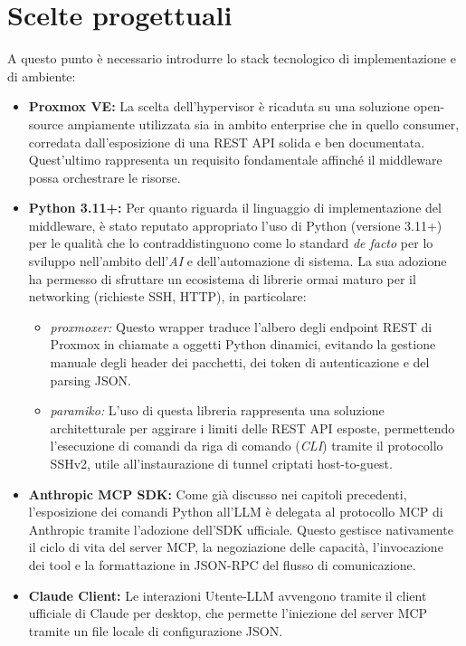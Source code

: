 \section{Scelte progettuali}
A questo punto è necessario introdurre lo stack tecnologico di implementazione e di ambiente:
\begin{itemize}
    \item \textbf{Proxmox VE:} La scelta dell'hypervisor è ricaduta su una soluzione open-source ampiamente utilizzata sia in ambito enterprise che in quello consumer, corredata dall'esposizione di una REST API solida e ben documentata. Quest'ultimo rappresenta un requisito fondamentale affinché il middleware possa orchestrare le risorse.

    \item \textbf{Python 3.11+:} Per quanto riguarda il linguaggio di implementazione del middleware, è stato reputato appropriato l'uso di Python (versione 3.11+) per le qualità che lo contraddistinguono come lo standard \textit{de facto} per lo sviluppo nell'ambito dell'\textit{AI} e dell'automazione di sistema. La sua adozione ha permesso di sfruttare un ecosistema di librerie ormai maturo per il networking (richieste SSH, HTTP), in particolare:
    \begin{itemize}
        \item \textit{proxmoxer:} Questo wrapper traduce l'albero degli endpoint REST di Proxmox in chiamate a oggetti Python dinamici, evitando la gestione manuale degli header dei pacchetti, dei token di autenticazione e del parsing JSON.
        \item \textit{paramiko:} L'uso di questa libreria rappresenta una soluzione architetturale per aggirare i limiti delle REST API esposte, permettendo l'esecuzione di comandi da riga di comando (\textit{CLI}) tramite il protocollo SSHv2, utile all'instaurazione di tunnel criptati host-to-guest.
    \end{itemize}
    
    \item \textbf{Anthropic MCP SDK:} Come già discusso nei capitoli precedenti, l'esposizione dei comandi Python all'LLM è delegata al protocollo MCP di Anthropic tramite l'adozione dell'SDK ufficiale. Questo gestisce nativamente il ciclo di vita del server MCP, la negoziazione delle capacità, l'invocazione dei tool e la formattazione in JSON-RPC del flusso di comunicazione.
    
    \item \textbf{Claude Client:} Le interazioni Utente-LLM avvengono tramite il client ufficiale di Claude per desktop, che permette l'iniezione del server MCP tramite un file locale di configurazione JSON.
\end{itemize}
